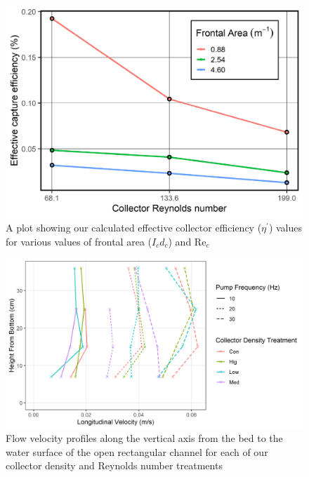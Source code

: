 \documentclass{scrreprt}
\newcommand\Rey{\mathrm{Re}}
\begin{document}
\begin{figure}[htbp]
\includegraphics[width=6in]{etafig.png}
\centering
\caption{A plot showing our calculated effective collector efficiency ($\eta^\prime$) values for various values of frontal area ($I_cd_c$) and $\Rey_c$}
\label{fig:eta}
\end{figure}

\begin{figure}[htbp]
\includegraphics[width=6in]{vectrino.png}
\centering
\caption{Flow velocity profiles along the vertical axis from the bed to the water surface of the open rectangular channel for each of our collector density and Reynolds number treatments}
\label{fig:vectrino}
\end{figure}



%
%



\end{document}
